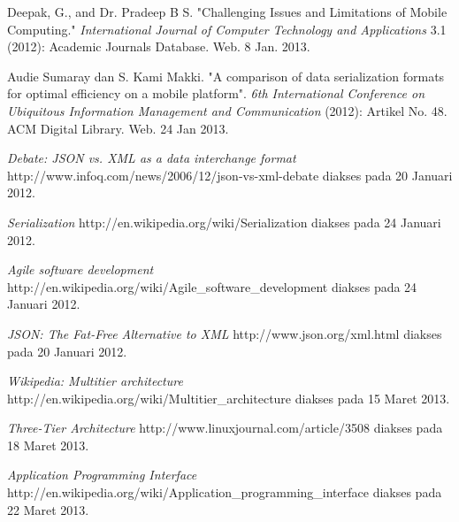 \documentclass[a4paper, 12pt, oneside]{report}
\begin{document}
\onehalfspacing 

\begin{thebibliography}{99}
\singlespacing 


Deepak, G., and Dr. Pradeep B S. "Challenging Issues and Limitations of Mobile Computing."
  \emph{International Journal of Computer Technology and Applications} 3.1 (2012): Academic Journals Database. Web. 8 Jan. 2013.
  
Audie Sumaray dan S. Kami Makki. "A comparison of data serialization formats for optimal efficiency on a mobile platform". \emph{6th International Conference on Ubiquitous Information Management and Communication} (2012): Artikel No. 48. ACM Digital Library. Web. 24 Jan 2013.
  
  \emph{Debate: JSON vs. XML as a data interchange format}
  http://www.infoq.com/news/2006/12/json-vs-xml-debate
  diakses pada 20 Januari 2012.
  
  \emph{Serialization}
  http://en.wikipedia.org/wiki/Serialization
  diakses pada 24 Januari 2012.
  
  \emph{Agile software development}
  http://en.wikipedia.org/wiki/Agile\_software\_development
  diakses pada 24 Januari 2012.
  
  \emph{JSON: The Fat-Free Alternative to XML}
  http://www.json.org/xml.html
  diakses pada 20 Januari 2012.
  
  \emph{Wikipedia: Multitier architecture}
  http://en.wikipedia.org/wiki/Multitier\_architecture
  diakses pada 15 Maret 2013.
  
  \emph{Three-Tier Architecture}
  http://www.linuxjournal.com/article/3508
  diakses pada 18 Maret 2013.
  
  \emph{Application Programming Interface}
  http://en.wikipedia.org/wiki/Application\_programming\_interface
  diakses pada 22 Maret 2013.
  

\end{thebibliography}
\end{document}
